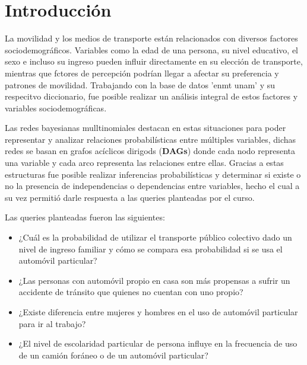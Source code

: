 \documentclass[12pt,a4paper]{article}
\begin{document}

\begin{abstract}
Este trabajo presenta un análisis de los patrones de movilidad y las características sociodemográficas de una población encuestada mediante el uso de grafos dirigidos acíclicos (\textbf{DAGs}) y redes bayesianas multinomiales. También es importante mencionar que se experimentó el poder explicar variables objetivo (nodos de las \textbf{DAGs}) mediante diversas técinas de regresión y clasificación, sin embargo esta metodología presentó un desempeño limitado en términos de ajuste y capacidad explicativa para los datos analizados, por lo cual se decidió seleccionar las variables para modelar las \textbf{DAGs} manualmente. 

\end{abstract}


\section{Introducción}
La movilidad y los medios de transporte están relacionados con diversos factores sociodemográficos. Variables como la edad de una persona, su nivel educativo, el sexo e incluso su ingreso pueden influir directamente en su elección de transporte, mientras que fctores de percepción podrían llegar a afectar su preferencia y patrones de movilidad. Trabajando con la base de datos 'enmt unam' y su respecitvo diccionario, fue posible realizar un análisis integral de estos factores y variables sociodemográficas. 

Las redes bayesianas mulltinomiales destacan en estas situaciones para poder representar y analizar relaciones probabilísticas entre múltiples variables, dichas redes se basan en grafos acíclicos dirigods (\textbf{DAGs}) donde cada nodo representa una variable y cada arco representa las relaciones entre ellas. Gracias a estas estructuras fue posible realizar inferencias probabilísticas y determinar si existe o no la presencia de independencias o dependencias entre variables, hecho el cual a su vez permitió darle respuesta a las queries planteadas por el curso. 

Las queries planteadas fueron las siguientes: 
\begin{itemize}
    \item ¿Cuál es la probabilidad de utilizar el transporte público colectivo dado un nivel de ingreso familiar y cómo se compara esa probabilidad si se usa el automóvil particular?
    \item ¿Las personas con automóvil propio en casa son más propensas a sufrir un accidente de tránsito que quienes no cuentan con uno propio?
    \item ¿Existe diferencia entre mujeres y hombres en el uso de automóvil particular para ir al trabajo?
    \item ¿El nivel de escolaridad particular de persona influye en la frecuencia de uso de un camión foráneo o de un automóvil particular?
\end{itemize} 
\end{document}

